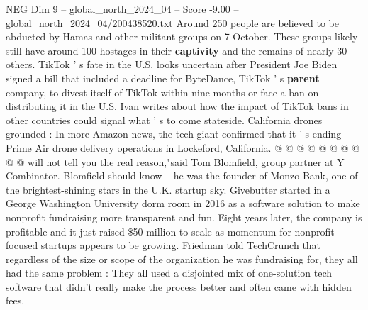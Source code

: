 \begin{textsample}{NEG Dim 9 – global\_north\_2024\_04 – Score -9.00 – global\_north\_2024\_04/200438520.txt}
Around 250 people are believed to be abducted by Hamas and other militant groups on 7 October.
These groups likely still have around 100 hostages in their \textbf{captivity} and the remains of nearly 30 others.
TikTok ' s fate in the U.S. looks uncertain after President Joe Biden signed a bill that included a deadline for ByteDance, TikTok ' s \textbf{parent} company, to divest itself of TikTok within nine months or face a ban on distributing it in the U.S.
Ivan writes about how the impact of TikTok bans in other countries could signal what ' s to come stateside.
California drones grounded : In more Amazon news, the tech giant confirmed that it ' s ending Prime Air drone delivery operations in Lockeford, California. @ @ @ @ @ @ @ @ @ @ will not tell you the real reason,"said Tom Blomfield, group partner at Y Combinator.
Blomfield should know -- he was the founder of Monzo Bank, one of the brightest-shining stars in the U.K. startup sky.
Givebutter started in a George Washington University dorm room in 2016 as a software solution to make nonprofit fundraising more transparent and fun.
Eight years later, the company is profitable and it just raised \$50 million to scale as momentum for nonprofit-focused startups appears to be growing.
Friedman told TechCrunch that regardless of the size or scope of the organization he was fundraising for, they all had the same problem : They all used a disjointed mix of one-solution tech software that didn't really make the process better and often came with hidden fees.

\end{textsample}
